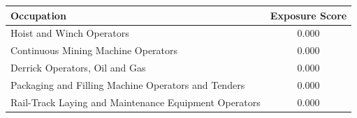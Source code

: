 \begin{tabular}{lc}
\hline
Occupation & Exposure Score \\
\hline
Hoist and Winch Operators&0.000\\
Continuous Mining Machine Operators&0.000\\
Derrick Operators, Oil and Gas&0.000\\
Packaging and Filling Machine Operators and Tenders&0.000\\
Rail-Track Laying and Maintenance Equipment Operators&0.000\\
\hline
\end{tabular}
